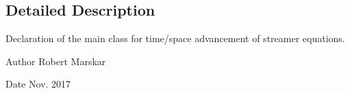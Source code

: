 \subsection{Detailed Description}
Declaration of the main class for time/space advancement of streamer equations. 

\begin{DoxyAuthor}{Author}
Robert Marskar 
\end{DoxyAuthor}
\begin{DoxyDate}{Date}
Nov. 2017 
\end{DoxyDate}
